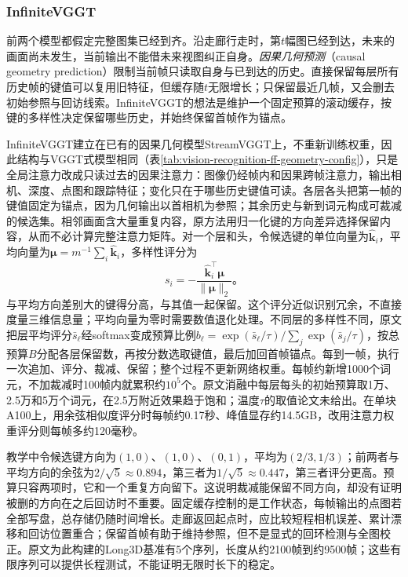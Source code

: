 \subsubsection{InfiniteVGGT}
\label{sec:vision-recognition-infinitevggt}

前两个模型都假定完整图集已经到齐。沿走廊行走时，第$t$幅图已经到达，未来的画面尚未发生，当前输出不能借未来视图纠正自身。\emph{因果几何预测}（causal geometry prediction）限制当前帧只读取自身与已到达的历史。直接保留每层所有历史帧的键值可以复用旧特征，但缓存随$t$无限增长；只保留最近几帧，又会删去初始参照与回访线索。InfiniteVGGT的想法是维护一个固定预算的滚动缓存，按键的多样性决定保留哪些历史，并始终保留首帧作为锚点。

InfiniteVGGT建立在已有的因果几何模型StreamVGGT上，不重新训练权重，因此结构与VGGT式模型相同（表\ref{tab:vision-recognition-ff-geometry-config}），只是全局注意力改成只读过去的因果注意力：图像仍经帧内和因果跨帧注意力，输出相机、深度、点图和跟踪特征；变化只在于哪些历史键值可读。各层各头把第一帧的键值固定为锚点，因为几何输出以首相机为参照；其余历史与新到词元构成可裁减的候选集。相邻画面含大量重复内容，原方法用归一化键的方向差异选择保留内容，从而不必计算完整注意力矩阵。对一个层和头，令候选键的单位向量为$\hat{\bm{k}}_i$，平均向量为$\bm{\mu}=m^{-1}\sum_i\hat{\bm{k}}_i$，多样性评分为
\begin{equation}
 s_i=-\frac{\hat{\bm{k}}_i^\top\bm{\mu}}
                 {\lVert\bm{\mu}\rVert_2}\text{。}
 \label{eq:vision-infinitevggt-diversity}
\end{equation}
与平均方向差别大的键得分高，与其值一起保留。这个评分近似识别冗余，不直接度量三维信息量；平均向量为零时需要数值退化处理。不同层的多样性不同，原文把层平均评分$\bar s_\ell$经softmax变成预算比例$b_\ell=\exp(\bar s_\ell/\tau)/\sum_j\exp(\bar s_j/\tau)$，按总预算$B$分配各层保留数，再按分数选取键值，最后加回首帧锚点。每到一帧，执行一次追加、评分、裁减、保留；整个过程不更新网络权重。每帧约新增1000个词元，不加裁减时100帧内就累积约$10^5$个。原文消融中每层每头的初始预算取1万、2.5万和5万个词元，在2.5万附近效果趋于饱和；温度$\tau$的取值论文未给出。在单块A100上，用余弦相似度评分时每帧约0.17秒、峰值显存约14.5GB，改用注意力权重评分则每帧多约120毫秒。

教学中令候选键方向为$(1,0)$、$(1,0)$、$(0,1)$，平均为$(2/3,1/3)$；前两者与平均方向的余弦为$2/\sqrt5\approx0.894$，第三者为$1/\sqrt5\approx0.447$，第三者评分更高。预算只容两项时，它和一个重复方向留下。这说明裁减能保留不同方向，却没有证明被删的方向在之后回访时不重要。固定缓存控制的是工作状态，每帧输出的点图若全部写盘，总存储仍随时间增长。走廊返回起点时，应比较短程相机误差、累计漂移和回访位置重合；保留首帧有助于维持参照，但不是显式的回环检测与全图校正。原文为此构建的Long3D基准有5个序列，长度从约2100帧到约9500帧；这些有限序列可以提供长程测试，不能证明无限时长下的稳定。

